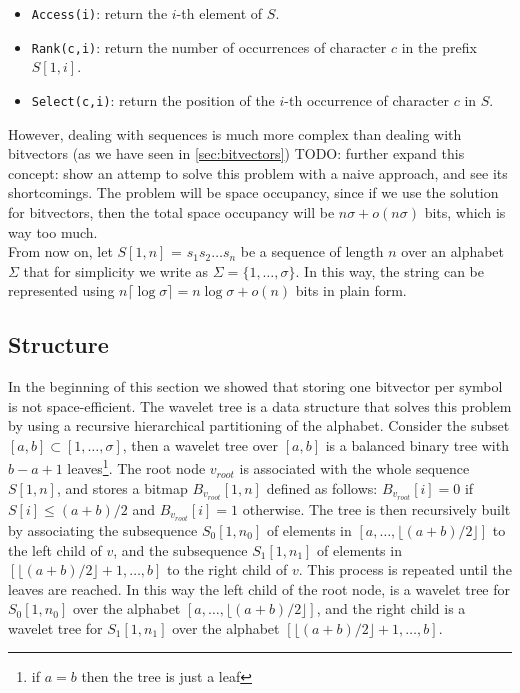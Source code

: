 \begin{itemize}
    \item \texttt{Access(i)}: return the $i$-th element of $S$.
    \item \texttt{Rank(c,i)}: return the number of occurrences of character $c$ in the prefix $S[1,i]$.
    \item \texttt{Select(c,i)}: return the position of the $i$-th occurrence of character $c$ in $S$.
\end{itemize}
However, dealing with sequences is much more complex than dealing with bitvectors (as we have seen in \autoref{sec:bitvectors})
\noindent TODO: further expand this concept: show an attemp to solve this problem with a naive approach, and see its shortcomings. The problem will be space occupancy, since if we use the solution for bitvectors, then the total space occupancy will be $n\sigma + o(n\sigma)$ bits, which is way too much. \cite{navarro2016compact} \\

\noindent From now on, let $S[1,n]$ = $s_1s_2\dots s_n$ be a sequence of length $n$ over an alphabet $\Sigma$ that for simplicity we write as $\Sigma = \{1,\dots,\sigma\}$. In this way, the string can be represented using $n \lceil \log \sigma \rceil = n \log \sigma + o(n)$ bits in plain form.

\subsection{Structure}

In the beginning of this section we showed that storing one bitvector per symbol is not space-efficient. The wavelet tree is a data structure that solves this problem by using a recursive hierarchical partitioning of the alphabet. Consider the subset $[a,b] \subset [1, \dots, \sigma]$, then a wavelet tree over $[a,b]$ is a balanced binary tree with $b-a+1$ leaves\footnote{if $a=b$ then the tree is just a leaf}. The root node $v_{root}$ is associated with the whole sequence $S[1,n]$, and stores a bitmap $B_{v_{root}}[1,n]$ defined as follows: $B_{v_{root}}[i] = 0$ if $S[i] \leq (a+b)/2$ and $B_{v_{root}}[i] = 1$ otherwise. The tree is then recursively built by associating the subsequence $S_0[1,n_0]$ of elements in $[a, \dots,\lfloor (a+b)/2 \rfloor ]$ to the left child of $v$, and the subsequence $S_1[1,n_1]$ of elements in $[\lfloor (a+b)/2 \rfloor +1,\dots, b]$ to the right child of $v$. This process is repeated until the leaves are reached. In this way the left child of the root node, is a wavelet tree for $S_0[1,n_0]$ over the alphabet $[a,\dots, \lfloor (a+b)/2 \rfloor ]$, and the right child is a wavelet tree for $S_1[1,n_1]$ over the alphabet $[\lfloor (a+b)/2 \rfloor +1,\dots, b]$. \cite{WTForALL}


